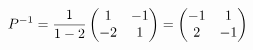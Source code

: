 \documentclass[preview]{standalone}
\begin{document}
\begin{align*}
\special{dvisvgm:raw <g id='unique000'>}P^{-1}=\dfrac{1}{1-2}\begin{pmatrix}1&-1\\-2&1\end{pmatrix}=\begin{pmatrix}-1&1\\2&-1\end{pmatrix}\special{dvisvgm:raw </g>}
\end{align*}
\end{document}
